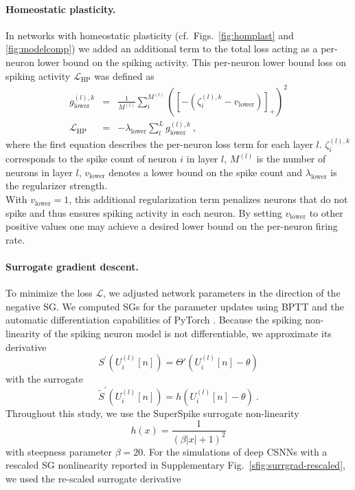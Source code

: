 \documentclass[11pt,a4paper]{article}
\begin{document}
\paragraph{Homeostatic plasticity.} In networks with homeostatic
plasticity (cf.\ Figs.~\ref{fig:homplast} and \ref{fig:modelcomp}) we added an additional term
to the total loss acting as a per-neuron
lower bound on the spiking activity. This per-neuron lower bound loss on
spiking activity $\mathcal{L}_{\text{HP}}$ was defined as
\begin{eqnarray}
g^{(l),k}_{\text{lower}} &=& \frac{1}{M^{(l)}} \sum_i^{M^{(l)}}\left(
\left[-\left(\zeta_i^{(l),k} - v_{\text{lower}}\right) \right]_+ \right)^2\\
\mathcal{L}_{\text{HP}} &=& -\lambda_{\text{lower}} \sum_l^L
g^{(l),k}_{\text{lower}}~,
\end{eqnarray}
where the first equation describes the per-neuron loss term for each layer $l$.
$\zeta_i^{(l),k}$ corresponds to the spike count of neuron $i$ in layer $l$,
$M^{(l)}$ is the number of neurons in layer $l$, $v_{\mathrm{lower}}$ denotes a
lower bound on the spike count and $\lambda_{\mathrm{lower}}$ is the
regularizer strength. \\
With $v_{\mathrm{lower}}=1$, this additional regularization term penalizes
neurons that do not spike and thus ensures spiking activity in each neuron. By setting $v_{\mathrm{lower}}$ to other
positive values one may achieve a desired lower bound on the per-neuron firing rate.

\paragraph{Surrogate gradient descent.} 
To minimize the loss $\mathcal{L}$, we adjusted network parameters in the direction of the negative \ac{SG}. 
We computed \acp{SG} for the parameter updates using \ac{BPTT} and the automatic differentiation capabilities of PyTorch \citep{NEURIPS2019_9015}. 
Because the spiking non-linearity of the spiking neuron model is not differentiable, we approximate its derivative \begin{equation}
S^{\prime}\left(U^{(l)}_i[n]\right) = \Theta' \left(U^{(l)}_i[n] - \theta \right)
\end{equation}
with the surrogate \begin{equation}
\tilde{S}^{\prime}\left(U^{(l)}_i[n]\right) = h\left(U^{(l)}_i[n] - \theta\right)~. 
\end{equation}
Throughout this study, we use the SuperSpike surrogate non-linearity \citep{Zenke2018-id}
\begin{equation}
	h(x) =\frac{1}{\left(\beta |x|+1\right)^2}
\end{equation}
with steepness parameter $\beta = 20$.
For the simulations of deep \acp{CSNN} with a rescaled \ac{SG} nonlinearity reported in Supplementary Fig.~\ref{sfig:surrgrad-rescaled}, we used the re-scaled surrogate derivative 
\end{document}
